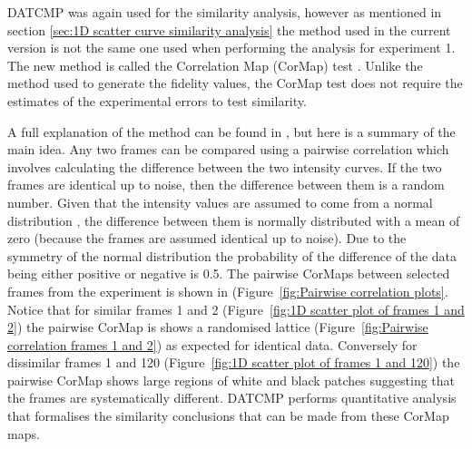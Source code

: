 DATCMP was again used for the similarity analysis, however as mentioned in section \ref{sec:1D scatter curve similarity analysis} the method used in the current version is not the same one used when performing the analysis for experiment 1.
The new method is called the Correlation Map (CorMap) test \cite{franke2015correlation}.
Unlike the method used to generate the fidelity values, the CorMap test does not require the estimates of the experimental errors to test similarity.

A full explanation of the method can be found in \cite{franke2015correlation}, but here is a summary of the main idea.
Any two frames can be compared using a pairwise correlation which involves calculating the difference between the two intensity curves.
If the two frames are identical up to noise, then the difference between them is a random number.
Given that the intensity values are assumed to come from a normal distribution \cite{franke2015correlation}, the difference between them is normally distributed with a mean of zero (because the frames are assumed identical up to noise).
Due to the symmetry of the normal distribution the probability of the difference of the data being either positive or negative is 0.5.
The pairwise CorMaps between selected frames from the experiment is shown in (Figure~\ref{fig:Pairwise correlation plots}.
Notice that for similar frames 1 and 2 (Figure~\ref{fig:1D scatter plot of frames 1 and 2}) the pairwise CorMap is shows a randomised lattice (Figure~\ref{fig:Pairwise correlation frames 1 and 2}) as expected for identical data.
Conversely for dissimilar frames 1 and 120 (Figure~\ref{fig:1D scatter plot of frames 1 and 120}) the pairwise CorMap shows large regions of white and black patches suggesting that the frames are systematically different.
DATCMP performs quantitative analysis that formalises the similarity conclusions that can be made from these CorMap maps.
